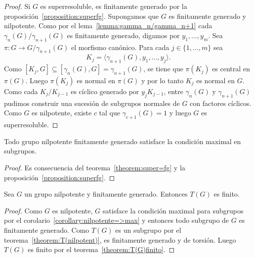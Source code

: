 \begin{proof}
	Si $G$ es superresoluble, es finitamente generado por la
	proposición~\ref{proposition:superfg}.  Supongamos que $G$ es finitamente
	generado y nilpotente. Como por el lema~\ref{lemma:gamma_n/gamma_n+1} cada
	$\gamma_{n}(G)/\gamma_{n+1}(G)$ es finitamente generado, digamos por
	$y_1,\dots,y_m$. Sea $\pi\colon G\to G/\gamma_{n+1}(G)$ el morfismo
	canónico.  Para cada $j\in\{1,\dots,m\}$ sea 
	\[
	K_j=\langle \gamma_{n+1}(G),y_1,\dots,y_j\rangle.
	\]
	Como
	$[K_j,G]\subseteq [\gamma_n(G),G]=\gamma_{n+1}(G)$, 
	se tiene que $\pi(K_j)$ es central en $\pi(G)$. Luego $\pi(K_j)$ es normal
	en $\pi(G)$ y por lo tanto $K_j$ es normal en $G$. Como cada $K_j/K_{j-1}$
	es cíclico generado por $y_jK_{j-1}$, entre $\gamma_n(G)$ y
	$\gamma_{n+1}(G)$ pudimos construir una sucesión de subgrupos normales de
	$G$ con factores cíclicos. Como $G$ es nilpotente, existe $c$ tal que
	$\gamma_{c+1}(G)=1$ y luego $G$ es superresoluble.
\end{proof}

\begin{corollary}
	\label{corollary:nilpotente=>max}
	Todo grupo nilpotente finitamente generado satisface la condición maximal
	en subgrupos.
\end{corollary}

\begin{proof}
	Es consecuencia del teorema~\ref{theorem:super=fg} y la
	proposición~\ref{proposition:superfg}.
\end{proof}

\begin{theorem}
	Sea $G$ un grupo nilpotente y finitamente generado. Entonces $T(G)$ es
	finito.
\end{theorem}

\begin{proof}
	Como $G$ es nilpotente, $G$ satisface la condición maximal para subgrupos
	por el corolario~\ref{corollary:nilpotente=>max} y entonces
	todo subgrupo de $G$ es finitamente generado. Como $T(G)$ es un subgrupo por el teorema~\ref{theorem:T(nilpotent)}, 
	es finitamente generado y de torsión. Luego $T(G)$ es finito por el
	teorema~\ref{theorem:T(G)finito}.
\end{proof}




